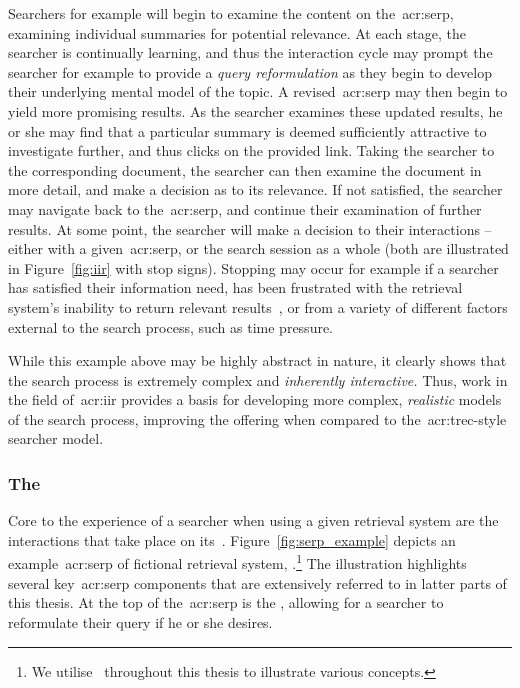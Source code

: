 Searchers for example will begin to examine the content on the~\gls{acr:serp}, examining individual summaries for potential relevance. At each stage, the searcher is continually learning, and thus the interaction cycle may prompt the searcher for example to provide a \emph{query reformulation} as they begin to develop their underlying mental model of the topic. A revised~\gls{acr:serp} may then begin to yield more promising results. As the searcher examines these updated results, he or she may find that a particular summary is deemed sufficiently attractive to investigate further, and thus clicks on the provided link. Taking the searcher to the corresponding document, the searcher can then examine the document in more detail, and make a decision as to its relevance. If not satisfied, the searcher may navigate back to the~\gls{acr:serp}, and continue their examination of further results. At some point, the searcher will make a decision to  their interactions -- either with a given~\gls{acr:serp}, or the search session as a whole (both are illustrated in Figure~\ref{fig:iir} with stop signs). Stopping may occur for example if a searcher has satisfied their information need, has been frustrated with the retrieval system's inability to return relevant results~\citep{cooper1973retrieval_effectiveness_ii}, or from a variety of different factors external to the search process, such as time pressure.

While this example above may be highly abstract in nature, it clearly shows that the search process is extremely complex and \emph{inherently interactive.} Thus, work in the field of~\gls{acr:iir} provides a basis for developing more complex, \emph{realistic} models of the search process, improving the offering when compared to the~\gls{acr:trec}-style searcher model.


\subsubsection{The~}\label{sec:ir_background:user:iir:serp}
Core to the experience of a searcher when using a given retrieval system are the interactions that take place on its~. Figure~\ref{fig:serp_example} depicts an example~\gls{acr:serp} of fictional retrieval system, \searchlogo.\footnote{We utilise \searchlogo~throughout this thesis to illustrate various concepts.} The illustration highlights several key~\gls{acr:serp} components that are extensively referred to in latter parts of this thesis. At the top of the~\gls{acr:serp} is the , allowing for a searcher to reformulate their query if he or she desires.

